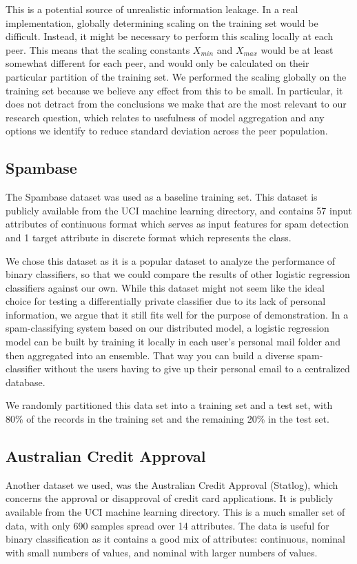 This is a potential source of unrealistic information leakage. In a real implementation, globally determining scaling on the training set would be difficult. Instead, it might be necessary to perform this scaling locally at each peer. This means that the scaling constants $X_{min}$ and $X_{max}$ would be at least somewhat different for each peer, and would only be calculated on their particular partition of the training set. We performed the scaling globally on the training set because we believe any effect from this to be small. In particular, it does not detract from the conclusions we make that are the most relevant to our research question, which relates to usefulness of model aggregation and any options we identify to reduce standard deviation across the peer population.  

\subsection{Spambase} \label{sec:spambase}
The Spambase dataset \cite{spambase1999data} was used as a baseline training set. This dataset is publicly available from the UCI machine learning directory, and contains 57 input attributes of continuous format which serves as input features for spam detection and 1 target attribute in discrete format which represents the class.

We chose this dataset as it is a popular dataset to analyze the performance of binary classifiers, so that we could compare the results of other logistic regression classifiers against our own. While this dataset might not seem like the ideal choice for testing a differentially private classifier due to its lack of personal information, we argue that it still fits well for the purpose of demonstration. In a spam-classifying system based on our distributed model, a logistic regression model can be built by training it locally in each user's personal mail folder and then aggregated into an ensemble. That way you can build a diverse spam-classifier without the users having to give up their personal email to a centralized database.     

We randomly partitioned this data set into a training set and a test set, with 80\% of the records in the training set and the remaining 20\% in the test set.

\subsection{Australian Credit Approval}
Another dataset we used, was the Australian Credit Approval (Statlog), which concerns the approval or disapproval of credit card applications. It is publicly available from the UCI machine learning directory. This is a much smaller set of data, with only 690 samples spread over 14 attributes. The data is useful for binary classification as it contains a good mix of attributes: continuous, nominal with small numbers of values, and nominal with larger numbers of values.

